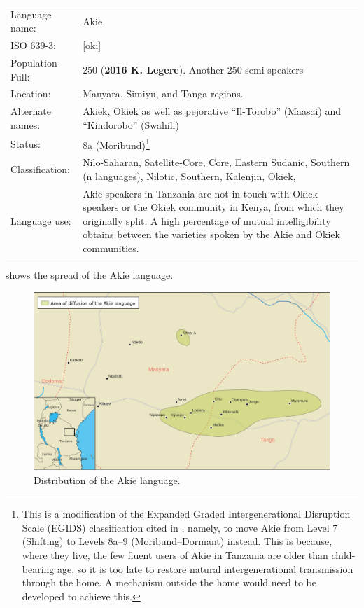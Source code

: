 \documentclass[output=paper,colorlinks,citecolor=brown]{langscibook}
\begin{document}
\ea\begin{tabularx}{\linewidth}[t]{lQ}
Language name: & Akie \\
ISO 639-3: &  	 [oki] \\
Population Full:	&  250 (\textbf{2016 K. Legere}). Another 250 semi-speakers \\
Location:	& 	Manyara, Simiyu, and Tanga regions. \\
Alternate names: & Akiek, Okiek as well as pejorative “Il-Torobo” (Maasai) and “Kindorobo” (Swahili) \\
Status: & 	8a (Moribund)\footnote{This is a modification of the Expanded Graded Intergenerational Disruption Scale (EGIDS) classification cited in \citet[7]{SimonsFennig2018}, namely, to move Akie from Level 7 (Shifting) to Levels 8a–9 (Moribund–Dormant) instead. This is because, where they live, the few fluent users of Akie in Tanzania are older than child-bearing age, so it is too late to restore natural intergenerational transmission through the home. A mechanism outside the home would need to be developed to achieve this. } \\
Classification:	 & Nilo-Saharan, Satellite-Core, Core, Eastern Sudanic, Southern (n languages), Nilotic, Southern, Kalenjin, Okiek, \\
Language use: & 	Akie speakers in Tanzania are not in touch with Okiek speakers or the Okiek community in Kenya, from which they originally split. A high percentage of mutual intelligibility obtains between the varieties spoken by the Akie and Okiek communities. \\
\end{tabularx}
\z

\noindent{} shows the spread of the Akie language.



\begin{figure}
    \includegraphics[width=\textwidth]{figures/akie_language_map.pdf}
    \caption{Distribution of the Akie language.\label{fig:legere:1}}
\end{figure}
\end{document}
